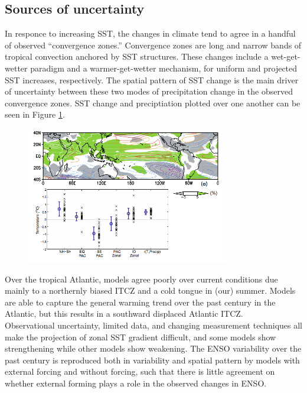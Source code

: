 \subsection{Sources of uncertainty}

In responce to increasing SST, the changes in climate tend to agree in a handful of observed ``convergence zones.''
Convergence zones are long and narrow bands of tropical convection anchored by SST structures.
These changes include a wet-get-wetter paradigm and a warmer-get-wetter mechanism, for uniform and projected SST increases, respectively.
The spatial pattern of SST change is the main driver of uncertainty between these two modes of precipitation change in the observed convergence zones.
SST change and preciptiation plotted over one another can be seen in Figure \ref{fig:148}.\\



\begin{figure}[h!]
\begin{center}
  \includegraphics[width=0.790\textwidth]{fig148.png}
  \label{fig:148}
\end{center}
\end{figure}


Over the tropical Atlantic, models agree poorly over current conditions due mainly to a northernly biased ITCZ and a cold tongue in (our) summer.
Models are able to capture the general warming trend over the past century in the Atlantic, but this results in a southward displaced Atlantic ITCZ.\\

Observational uncertainty, limited data, and changing measurement techniques all make the projection of zonal SST gradient difficult, and some models show strengthening while other models show weakening.
The ENSO variability over the past century is reproduced both in variability and spatial pattern by models with external forcing and without forcing, such that there is little agreement on whether external forming plays a role in the observed changes in ENSO.\\

